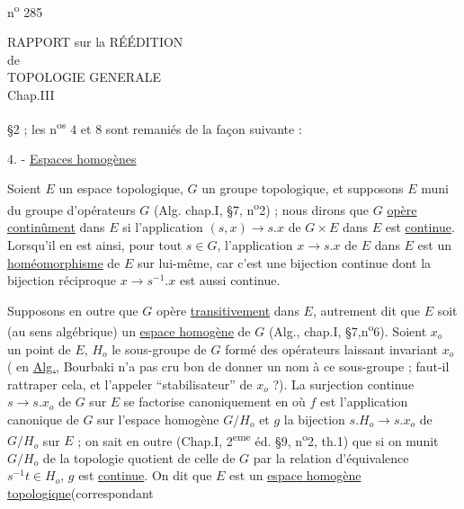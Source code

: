 \hfill n\textsuperscript{o} 285
\begin{center}
RAPPORT sur la RÉÉDITION\\
de\\
TOPOLOGIE GENERALE\\
Chap.III
\end{center}

§2 ; les n\textsuperscript{os} 4 et 8 sont remaniés de la façon suivante :

4. - \uline{Espaces homogènes}

Soient $E$ un espace topologique, $G$ un groupe topologique, et supposons $E$ muni du groupe d'opérateurs $G$ (Alg. chap.I, §7, n\textsuperscript{o}2) ; nous dirons que $G$ \uline{opère continûment} dans $E$ si l'application $(s,x)\longrightarrow s.x$ de $G\times E$ dans $E$ est \uline{continue}. Lorsqu'il en est ainsi, pour tout $s\in G$, l'application $x\longrightarrow s.x$ de $E$ dans $E$ est un \uline{homéomorphisme} de $E$ sur lui-même, car c'est une bijection continue dont la bijection réciproque $x\longrightarrow s^{-1}.x$ est aussi continue.

Supposons en outre que $G$ opère \uline{transitivement} dans $E$, autrement dit que $E$ soit (au sens algébrique) un \uline{espace homogène} de $G$ (Alg., chap.I, §7,n\textsuperscript{o}6). Soient $x_o$ un point de $E$, $H_o$ le sous-groupe de $G$ formé des opérateurs laissant invariant $x_o$ ( en \uline{Alg.}, Bourbaki n'a pas cru bon de donner un nom à ce sous-groupe ; faut-il rattraper cela, et l'appeler ``stabilisateur'' de $x_o$ ?). La surjection continue $s\longrightarrow s.x_o$ de $G$ sur $E$ se factorise canoniquement en
où $f$ est l'application canonique de $G$ sur l'espace homogène $G/H_o$ et $g$ la bijection $s.H_o\longrightarrow s.x_o$ de $G/H_o$ sur $E$ ; on sait en outre (Chap.I, 2\textsuperscript{eme} éd. §9, n\textsuperscript{o}2, th.1) que si on munit $G/H_o$ de la topologie quotient de celle de $G$ par la relation d'équivalence $s^{-1}t\in H_o$, $g$ est \uline{continue}. On dit que $E$ est un \uline{espace homogène topologique}(correspondant
